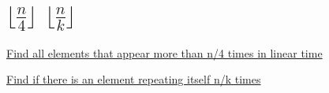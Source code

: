 \documentclass[11pt]{article}
\begin{document}
\section{\(\lfloor\frac{n}{4}\rfloor\) \(\lfloor\frac{n}{k}\rfloor\)}
\label{sec:orgdfb8a23}

\href{https://stackoverflow.com/questions/24691048/find-all-elements-that-appear-more-than-n-4-times-in-linear-time}{Find all elements that appear more than n/4 times in linear time}

\href{https://stackoverflow.com/questions/3001181/find-if-there-is-an-element-repeating-itself-n-k-times/24642388\#24642388}{Find if there is an element repeating itself n/k times}
\end{document}
